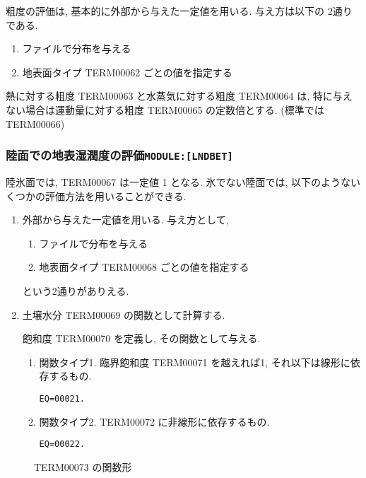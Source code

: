 粗度の評価は, 基本的に外部から与えた一定値を用いる. 
与え方は以下の 2通りである. 
\begin{enumerate}
    \item ファイルで分布を与える
    \item 地表面タイプ TERM00062 ごとの値を指定する
\end{enumerate}

熱に対する粗度 TERM00063 と水蒸気に対する粗度 TERM00064 は, 
特に与えない場合は運動量に対する粗度 TERM00065 の定数倍とする. 
(標準では TERM00066)

\subsubsection{陸面での地表湿潤度の評価\texttt{MODULE:[LNDBET]}}

陸氷面では, TERM00067 は一定値 1 となる.
氷でない陸面では, 以下のようないくつかの評価方法を用いることができる.
\begin{enumerate}
\item 外部から与えた一定値を用いる. 与え方として,
      \begin{enumerate}
      \item ファイルで分布を与える
      \item 地表面タイプ TERM00068 ごとの値を指定する
      \end{enumerate}
      という2通りがありえる.

\item 土壌水分 TERM00069 の関数として計算する.

       飽和度 TERM00070 を定義し,
       その関数として与える.

      \begin{enumerate}
      \item 関数タイプ1.
            臨界飽和度 TERM00071 を越えれば1, それ以下は線形に依存するもの.

        \begin{verbatim}
EQ=00021.
\end{verbatim}

      \item 関数タイプ2. TERM00072 に非線形に依存するもの.

        \begin{verbatim}
EQ=00022.
\end{verbatim}
      \end{enumerate}

\end{enumerate}

  \begin{figure}[htbp]
    \begin{center}
      \leavevmode
      \caption{TERM00073 の関数形}
    \end{center}
  \end{figure}


